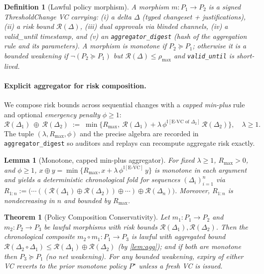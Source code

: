 \documentclass[10pt]{article}
\newtheorem{lemma}{Lemma}
\newtheorem{theorem}{Theorem}
\newtheorem{definition}{Definition}
\begin{document}
\begin{definition}[Lawful policy morphism]
\label{def:policy-morphism}
A morphism $m:P_1\to P_2$ is a signed \emph{ThresholdChange VC} carrying:
(i) a \emph{delta} $\Delta$ (typed changeset + justifications), (ii) a \emph{risk bound} $\mathcal R(\Delta)$,
(iii) \emph{dual approvals} via blinded channels, (iv) a \emph{valid\_until} timestamp, and
(v) an \texttt{aggregator\_digest} (hash of the aggregation rule and its parameters).
A morphism is \emph{monotone} if $P_2\succeq P_1$; otherwise it is a \emph{bounded weakening}
if $\neg(P_2\succeq P_1)$ but $\mathcal R(\Delta)\le \rho_{\max}$ and \texttt{valid\_until} is short-lived.
\end{definition}

\paragraph{Explicit aggregator for risk composition.}
We compose risk bounds across sequential changes with a \emph{capped min-plus} rule and optional
\emph{emergency penalty} $\phi\ge 1$:
\[
\mathcal R(\Delta_1)\ \oplus\ \mathcal R(\Delta_2)
\;:=\;
\min\!\big\{R_{\max},\ \mathcal R(\Delta_1)+\lambda\,\phi^{\mathbb{I}[\text{E-VC of }\Delta_2]}\,\mathcal R(\Delta_2)\big\},
\quad \lambda\ge 1 .
\]
The tuple $(\lambda, R_{\max}, \phi)$ and the precise algebra are recorded in \texttt{aggregator\_digest}
so auditors and replays can recompute aggregate risk exactly.

\begin{lemma}[Monotone, capped min-plus aggregator]
\label{lem:agg}
For fixed $\lambda\!\ge\!1$, $R_{\max}{>}0$, and $\phi\!\ge\!1$,
$x\oplus y=\min\{R_{\max},x+\lambda\,\phi^{\mathbb{I}[\text{E-VC}]}\,y\}$ is monotone in each argument and
yields a deterministic chronological fold for sequences $(\Delta_i)_{i=1}^n$ via
$R_{1:n}:=\big(\cdots((\mathcal R(\Delta_1)\oplus \mathcal R(\Delta_2))\oplus\cdots)\oplus \mathcal R(\Delta_n)\big)$.
Moreover, $R_{1:n}$ is nondecreasing in $n$ and bounded by $R_{\max}$.
\end{lemma}

\begin{theorem}[Policy Composition Conservativity]
\label{thm:policy-conservativity}
Let $m_1:P_1\!\to\!P_2$ and $m_2:P_2\!\to\!P_3$ be lawful morphisms with risk bounds
$\mathcal R(\Delta_1),\mathcal R(\Delta_2)$. Then the chronological composite $m_2\!\circ\! m_1:P_1\!\to\!P_3$ is lawful with
aggregated bound $\mathcal R(\Delta_2\!\circ\!\Delta_1)\le \mathcal R(\Delta_1)\oplus \mathcal R(\Delta_2)$ (by \autoref{lem:agg});
and if both are monotone then $P_3\succeq P_1$ (no net weakening).
For any bounded weakening, expiry of either VC reverts to the prior monotone policy $P^\star$ unless a fresh VC is issued.
\end{theorem}
\end{document}
